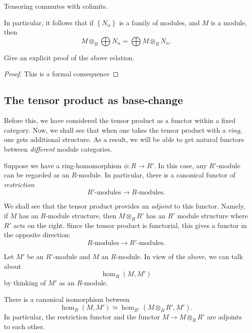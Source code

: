 \begin{proposition}
Tensoring commutes with colimits.
\end{proposition}

In particular, it follows that if $\left\{N_\alpha\right\}$ is a family of
modules, and $M$ is a module, then
\[ M \otimes_R \bigoplus N_\alpha = \bigoplus M \otimes_R N_\alpha.  \]
\begin{exercise}
Give an explicit proof of the above relation.
\end{exercise}

\begin{proof}
This is a formal consequence
\end{proof}

\subsection{The tensor product as base-change}

Before this, we have considered the tensor product as a functor within a
fixed category. Now, we shall see that when one takes the tensor product with a
\emph{ring}, one gets additional structure. As a result, we will be able to
get natural functors between  \emph{different} module categories.

Suppose we have a
ring-homomorphism $\phi:R \to R'$.  In this case, any $R'$-module can be
regarded as
an $R$-module.
In particular, there is a canonical functor of \emph{restriction}
\[ R'\mbox{-}\mathrm{modules} \to R\mbox{-}\mathrm{modules}.  \]

We shall see that the tensor product provides an \emph{adjoint} to this
functor.
Namely, if $M$ has an $R$-module
structure, then $M \otimes_R R'$ has an $R'$ module structure where $R'$ acts
on the right. Since the tensor product is functorial, this gives a functor
in the opposite direction:
\[ R\mbox{-}\mathrm{modules} \to R'\mbox{-}\mathrm{modules}.  \]


Let $M'$ be an $R'$-module and $M$ an $R$-module. In view of the above,
we can talk about
\[ \hom_R(M, M')  \]
by thinking of $M'$ as an $R$-module.

\begin{proposition}
There is a canonical isomorphism between
\[ \hom_R(M, M') \simeq \hom_{R'}(M \otimes_R R', M').  \]
In particular, the restriction functor and the functor $M \to M \otimes_R R'$
are adjoints to each other.
\end{proposition}


